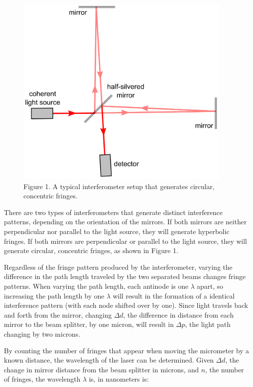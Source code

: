 \documentclass{article}
\begin{document}
\bigskip
\begin{figure}[!ht]
\begingroup
    \rightskip
    \leftskip
    \begin{center}
        \includegraphics[width=300pt,height=270pt]{interferometer.png}
        \caption*{Figure 1. A typical interferometer setup that generates circular, concentric fringes.}
    \end{center}
\endgroup
\end{figure}

There are two types of interferometers that generate distinct interference patterns, depending on the orientation of the mirrors. If both mirrors are neither perpendicular nor parallel to the light source, they will generate hyperbolic fringes. If both mirrors are perpendicular or parallel to the light source, they will generate circular, concentric fringes, as shown in Figure 1.

\bigskip

Regardless of the fringe pattern produced by the interferometer, varying the difference in the path length traveled by the two separated beams changes fringe patterns. When varying the path length, each antinode is one $\lambda$ apart, so increasing the path length by one $\lambda$ will result in the formation of a identical interference pattern (with each node shifted over by one). Since light travels back and forth from the mirror, changing $\Delta d$, the difference in distance from each mirror to the beam splitter, by one micron, will result in $\Delta p$, the light path changing by two microns.

\bigskip

By counting the number of fringes that appear when moving the micrometer by a known distance, the wavelength of the laser can be determined. Given $\Delta d$, the change in mirror distance from the beam splitter in microns, and $n$, the number of fringes, the wavelength $\lambda$ is, in nanometers is:
\end{document}

